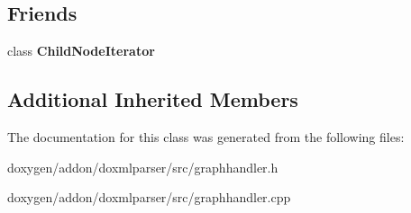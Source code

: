 \subsection*{Friends}
\begin{DoxyCompactItemize}
\item 
\mbox{\label{class_node_handler_a667d8ca5ea4d4cddbf115f89fb093c21}} 
class {\bfseries Child\+Node\+Iterator}
\end{DoxyCompactItemize}
\subsection*{Additional Inherited Members}


The documentation for this class was generated from the following files\+:\begin{DoxyCompactItemize}
\item 
doxygen/addon/doxmlparser/src/graphhandler.\+h\item 
doxygen/addon/doxmlparser/src/graphhandler.\+cpp\end{DoxyCompactItemize}
